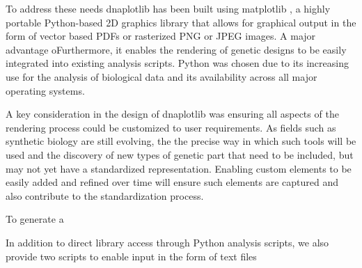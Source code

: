 \documentclass{bioinfo}
\begin{document}


To address these needs dnaplotlib has been built using matplotlib \citep{Hunter07a}, a highly portable Python-based 2D graphics library that allows for graphical output in the form of vector based PDFs or rasterized PNG or JPEG images. A major advantage oFurthermore, it enables the rendering of genetic designs to be easily integrated into existing analysis scripts. Python was chosen due to its increasing use for the analysis of biological data \citep{Cock09a} and its availability across all major operating systems.

A key consideration in the design of dnaplotlib was ensuring all aspects of the rendering process could be customized to user requirements. As fields such as synthetic biology are still evolving, the the precise way in which such tools will be used and the discovery of new types of genetic part that need to be included, but may not yet have a standardized representation. Enabling custom elements to be easily added and refined over time will ensure such elements are captured and also contribute to the standardization process. 

To generate a 

In addition to direct library access through Python analysis scripts, we also provide two scripts to enable input in the form of text files
\end{document}
